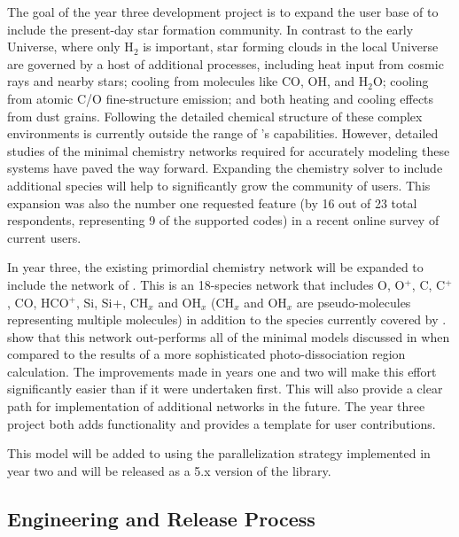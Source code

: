 The goal of the year three development project is to expand the user
base of \grackle{} to include the present-day star formation
community.  
In contrast to the early Universe, where only H$_{2}$ is important,
star forming clouds in the local Universe are governed by a host of
additional processes, including heat input from cosmic rays and nearby
stars; cooling from molecules like CO, OH, and H$_{2}$O; cooling from
atomic C/O fine-structure emission; and both heating and cooling
effects from dust grains.  Following the detailed chemical structure
of these complex environments is currently outside the range of
\grackle{}'s capabilities.  However, detailed studies of the minimal
chemistry networks required for accurately modeling these systems
\citep{2012MNRAS.421..116G, 2017ApJ...843...38G} have paved the way
forward.  Expanding the chemistry solver to include additional species
will help to significantly grow the community of \grackle{} users.
This expansion was also the number one requested feature (by 16 out of
23 total respondents, representing 9 of the supported codes) in a
recent online survey of current \grackle{} users.

In year three, the existing primordial chemistry network will be
expanded to include the network of \citet{2017ApJ...843...38G}.  This
is an 18-species network that includes O, O$^{+}$, C, C$^{+}$, CO,
HCO$^{+}$, Si, Si$^{}$+, CH$_{x}$ and OH$_{x}$ (CH$_{x}$ and OH$_{x}$
are pseudo-molecules representing multiple molecules) in addition to
the species currently covered by \grackle{}.
\citet{2017ApJ...843...38G} show that this network out-performs all of
the minimal models discussed in \citep{2012MNRAS.421..116G} when
compared to the results of a more sophisticated photo-dissociation
region calculation.  The improvements made in years one and two will
make this effort significantly easier than if it were undertaken
first.  This will also provide a clear path for implementation of
additional networks in the future.  The year three project both adds
functionality and provides a template for user contributions.

This model will be added to \grackle{} using the parallelization
strategy implemented in year two and will be released as a 5.x version
of the \grackle{} library.

\subsection{Engineering and Release Process}

